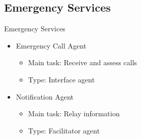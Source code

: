 \subsection{Emergency Services}
\begin{frame}{Emergency Services}
    \begin{itemize}
        \item Emergency Call Agent
        \begin{itemize}
            \item Main task: Receive and assess calls
            \item Type: Interface agent
        \end{itemize}
        \item Notification Agent
        \begin{itemize}
            \item Main task: Relay information
            \item Type: Facilitator agent
        \end{itemize}
    \end{itemize}
\end{frame} 